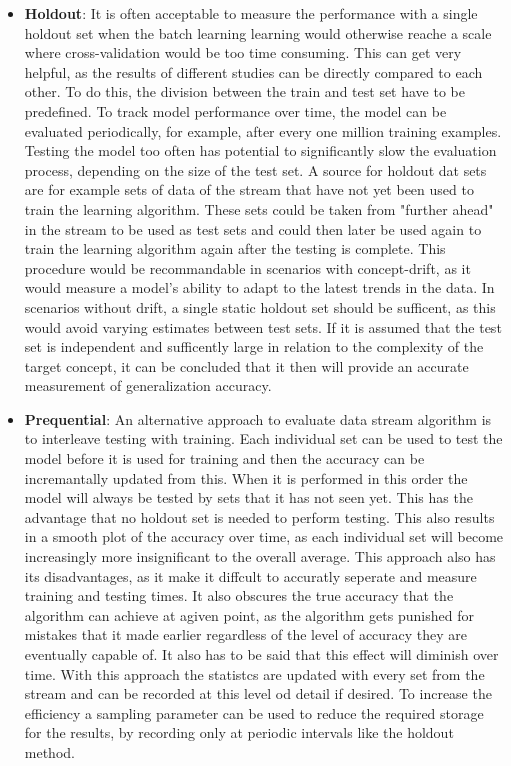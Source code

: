 \documentclass[12pt,oneside,a4paper,parskip]{scrbook}
\begin{document}
\begin{itemize}
  \item \textbf{Holdout}:
        It is often acceptable to measure the performance with a single holdout set when the batch learning learning 
        would otherwise reache a scale where cross-validation would be too time consuming.
        This can get very helpful, as the results of different studies can be directly compared to each other. 
        To do this, the division between the train and test set have to be predefined.
        To track model performance over time, the model can be evaluated periodically, for example, after every 
        one million training examples. Testing the model too often has potential to significantly slow the evaluation 
        process, depending on the size of the test set.
        A source for holdout dat sets are for example sets of data of the stream that have not yet been used to train 
        the learning algorithm.
        These sets could be taken from "further ahead" in the stream to be used as test sets and could then later be 
        used again to train the learning algorithm again after the testing is complete.
        This procedure would be recommandable in scenarios with concept-drift, as it would measure a model’s ability
        to adapt to the latest trends in the data.
        In scenarios without drift, a single static holdout set should be sufficent, as this would avoid varying estimates 
        between test sets.
        If it is assumed that the test set is independent and sufficently large in relation to the complexity of the 
        target concept, it can be concluded that it then will provide an accurate measurement of generalization accuracy.
        \cite{Bifet_datastream}
  \item \textbf{Prequential}:
        An alternative approach to evaluate data stream algorithm is to interleave testing with training. Each individual
        set can be used to test the model before it is used for training and then the accuracy can be incremantally updated
        from this. When it is performed in this order the model will always be tested by sets that it has not seen yet.
        This has the advantage that no holdout set is needed to perform testing. This also results in a smooth plot of 
        the accuracy over time, as each individual set will become increasingly more insignificant to the overall average.
        This approach also has its disadvantages, as it make it diffcult to accuratly seperate and measure
        training and testing times. It also obscures the true accuracy that the algorithm can achieve at agiven point, as the 
        algorithm gets punished for mistakes that it made earlier regardless of the level of accuracy they are eventually
        capable of. It also has to be said that this effect will diminish over time.
        With this approach the statistcs are updated with every set from the stream and can be recorded at this level od detail
        if desired. To increase the efficiency a sampling parameter can be used to reduce the required storage for the results,
        by recording only at periodic intervals like the holdout method.
        \cite{Bifet_datastream}
\end{itemize}
\end{document}

